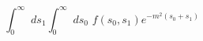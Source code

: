 \begin{equation}
  \int^\infty_0\,\,ds_1
    \int^\infty_0\,\,ds_0\,\,
    f(s_0,s_1)e^{-m^2(s_0+s_1)}
\end{equation}

